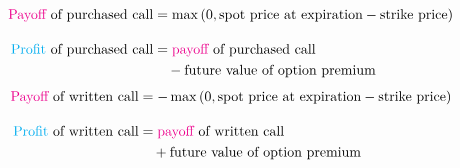 \begin{frame}[fragile,t]
	\begin{align*}
		\text{\textcolor{magenta}{Payoff} of purchased call} & = \max \left( 0, \text{spot price at expiration} - \text{strike price} \right) \\[1em]
		\text{\textcolor{cyan}{Profit} of purchased call}    & = \text{\textcolor{magenta}{payoff} of purchased call}                         \\
																												 & \quad -\text{future value of option premium}
	\end{align*}
	\bigskip
	\mySeparateLine
	\bigskip
	\begin{align*}
		\text{\textcolor{magenta}{Payoff} of written call} & = - \max \left( 0, \text{spot price at expiration} - \text{strike price} \right) \\[1em]
		\text{\textcolor{cyan}{Profit} of written call}    & = \text{\textcolor{magenta}{payoff} of written call}                             \\
                                                       & \quad + \text{future value of option premium}
	\end{align*}
\end{frame}
